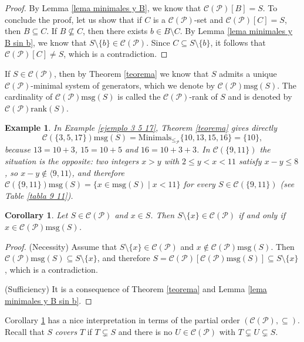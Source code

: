 \documentclass[11pt]{article}
\newtheorem{corollary}[theorem]{Corollary}
\newtheorem{example}[theorem]{Example}
\numberwithin{equation}{section}
\newcommand{\CP}{\mathcal C(\mathcal P)}
\newcommand{\rk}{\mathrm{rank}}
\newcommand{\msg}{\mathrm{msg}}
\begin{document}
\begin{proof}
    By Lemma \ref{lema minimales y B}, we know that $\mathcal C(\mathcal P)[B]=S$. To conclude the proof, let us show that if $C$ is a $\mathcal C(\mathcal P)$-set and $\mathcal C(\mathcal P)[C]=S$, then $B\subseteq C$. If $B\not\subseteq C$, then there exists $b\in B\setminus C$. By Lemma \ref{lema minimales y B sin b}, we know that $S\setminus\{b\}\in\mathcal C(\mathcal P)$. Since $C\subseteq S\setminus\{b\}$, it follows that $\mathcal C(\mathcal P)[C]\ne S$, which is a contradiction.
\end{proof}

If $S\in\mathcal C(\mathcal P)$, then by Theorem \ref{teorema} we know that $S$ admits a unique $\mathcal C(\mathcal P)$-minimal system of generators, which we denote by $\mathcal C(\mathcal P)\mathrm{msg}(S)$. The cardinality of $\CP\msg(S)$ is called the $\mathcal C(\mathcal P)$-rank of $S$ and is denoted by $\CP\rk(S)$.

\begin{example}\label{ejemplo msg}
In Example \ref{ejemplo 3 5 17}, Theorem \ref{teorema} gives directly
\[
\mathcal C(\{3,5,17\})\msg(S)=\mathrm{Minimals}_{\leq_{\mathcal P}}\{10,13,15,16\}=\{10\},
\]
because $13=10+3$, $15=10+5$ and $16=10+3+3$. In $\mathcal C(\{9,11\})$ the situation is the opposite: two integers $x>y$ with $2\leq y<x<11$ satisfy $x-y\leq 8$, so $x-y\notin\langle 9,11\rangle$, and therefore $\mathcal C(\{9,11\})\msg(S)=\{x\in\msg(S)\mid x<11\}$ for every $S\in\mathcal C(\{9,11\})$ (see Table \ref{tabla 9 11}).
\end{example}

\begin{corollary}\label{corolario quitar}
    Let $S\in\mathcal C(\mathcal P)$ and $x\in S$. Then $S\setminus\{x\}\in\mathcal C(\mathcal P)$ if and only if $x\in \mathcal C(\mathcal P)\mathrm{msg}(S)$.
\end{corollary}

\begin{proof}
    (Necessity) Assume that $S\setminus\{x\}\in\CP$ and $x\notin\CP\msg(S)$. Then $\CP\msg(S)\subseteq S\setminus\{x\}$, and therefore $S=\CP[\CP\msg(S)]\subseteq S\setminus\{x\}$, which is a contradiction.

    (Sufficiency) It is a consequence of Theorem \ref{teorema} and Lemma \ref{lema minimales y B sin b}.
\end{proof}

Corollary \ref{corolario quitar} has a nice interpretation in terms of the partial order $(\CP,\subseteq)$. Recall that $S$ \textit{covers} $T$ if $T\subsetneq S$ and there is no $U\in\CP$ with $T\subsetneq U\subsetneq S$.
\end{document}
